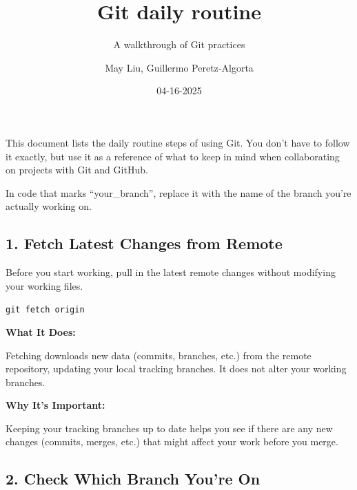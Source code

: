 \documentclass[
  letterpaper,
  DIV=11,
  numbers=noendperiod]{scrartcl}
\title{Git daily routine}
\subtitle{A walkthrough of Git practices}
\author{May Liu, Guillermo Peretz-Algorta}
\date{04-16-2025}
\renewcommand*\contentsname{Table of contents}
\newcommand\contentsname{Table of contents}
\begin{document}
\maketitle

\renewcommand*\contentsname{Table of contents}
{
\hypersetup{linkcolor=}
\setcounter{tocdepth}{3}
\tableofcontents
}

This document lists the daily routine steps of using Git. You don't have
to follow it exactly, but use it as a reference of what to keep in mind
when collaborating on projects with Git and GitHub.

\begin{tcolorbox}[enhanced jigsaw, toptitle=1mm, bottomtitle=1mm, arc=.35mm, titlerule=0mm, colframe=quarto-callout-tip-color-frame, colbacktitle=quarto-callout-tip-color!10!white, coltitle=black, bottomrule=.15mm, leftrule=.75mm, breakable, opacitybacktitle=0.6, title=\textcolor{quarto-callout-tip-color}{\faLightbulb}\hspace{0.5em}{Reminder}, colback=white, left=2mm, toprule=.15mm, opacityback=0, rightrule=.15mm]

In code that marks ``your\_branch'', replace it with the name of the
branch you're actually working on.

\end{tcolorbox}

\subsection{1. Fetch Latest Changes from
Remote}\label{fetch-latest-changes-from-remote}

Before you start working, pull in the latest remote changes without
modifying your working files.

\texttt{git\ fetch\ origin}

\textbf{What It Does:}

Fetching downloads new data (commits, branches, etc.) from the remote
repository, updating your local tracking branches. It does not alter
your working branches.

\textbf{Why It's Important:}

Keeping your tracking branches up to date helps you see if there are any
new changes (commits, merges, etc.) that might affect your work before
you merge.

\subsection{2. Check Which Branch You're
On}\label{check-which-branch-youre-on}
\end{document}
